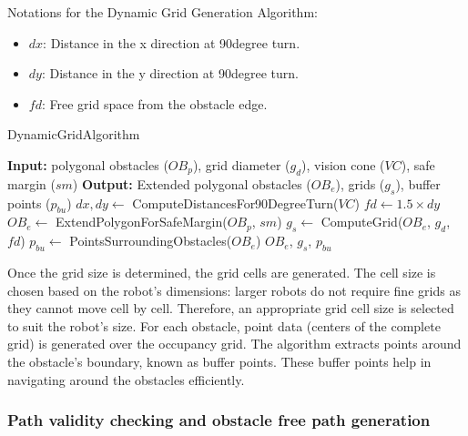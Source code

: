 \vspace*{6mm}  

Notations for the Dynamic Grid Generation Algorithm:
\begin{itemize}[noitemsep,topsep=0pt]
    \item $dx$: Distance in the x direction at 90degree turn.
    \item $dy$: Distance in the y direction at 90degree turn.
    \item $fd$: Free grid space from the obstacle edge.  
\end{itemize}

\begin{algorithm}[H]
    \caption{DynamicGridAlgorithm}
    \label{alg:setup_obstacle_algorithm}
    \begin{algorithmic}[1]
    \Statex \textbf{Input:} polygonal obstacles ($OB_p$), grid diameter ($g_d$), vision cone ($VC$), safe margin ($sm$)
    \Statex \textbf{Output:} Extended polygonal obstacles ($OB_e$), grids ($g_s$), buffer points ($p_{bu}$)
    \newline
    \State $dx, dy \leftarrow$ ComputeDistancesFor90DegreeTurn($VC$)
    \State $fd \leftarrow 1.5 \times dy$
    \State $OB_e \leftarrow$ ExtendPolygonForSafeMargin($OB_p$, $sm$)
    \State $g_s \leftarrow$ ComputeGrid($OB_e$, $g_d$, $fd$)
    \State $p_{bu} \leftarrow$ PointsSurroundingObstacles($OB_e$)
    \State \Return $OB_e$, $g_s$, $p_{bu}$
    \end{algorithmic}
    \end{algorithm}

\vspace*{6mm}  


Once the grid size is determined, the grid cells are generated. The cell size is chosen based on the robot's dimensions: larger robots do not require fine grids as they cannot move cell by cell. Therefore, an appropriate grid cell size is selected to suit the robot's size. For each obstacle, point data (centers of the complete grid) is generated over the occupancy grid. The algorithm extracts points around the obstacle's boundary, known as buffer points. These buffer points help in navigating around the obstacles efficiently.



\subsubsection{Path validity checking and obstacle free path generation}

